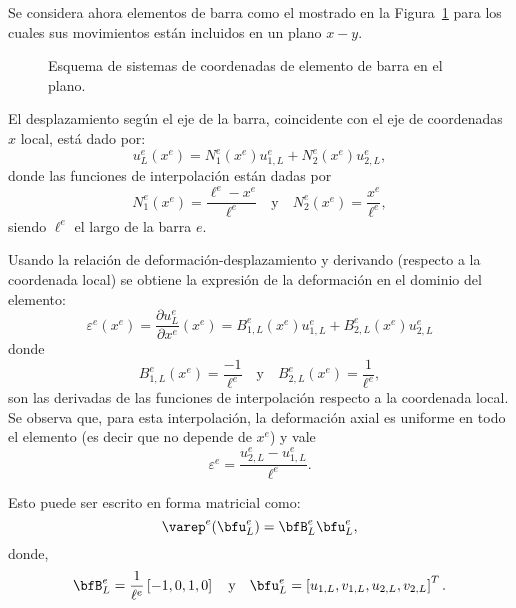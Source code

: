 Se considera ahora elementos de barra como el mostrado en la Figura~\ref{fig:eleplabar} para los cuales sus movimientos están incluidos en un plano $x-y$. %
%
\begin{figure}[htb]
	\centering
  \def\svgwidth{0.6\textwidth}
  
	\caption{Esquema de sistemas de coordenadas de elemento de barra en el plano.}
	\label{fig:eleplabar}
\end{figure}

El desplazamiento según el eje de la barra, coincidente con el eje de coordenadas $x$ local, está dado por:
%
\begin{equation}
u_L^e(x^e) = N_1^e(x^e) u_{1,L}^e  + N_2^e(x^e) u_{2,L}^e,
\end{equation}
%
donde las funciones de interpolación están dadas por
%
\begin{equation}
N_1^e(x^e) = \frac{\ell^e - x^e}{\ell^e}
\quad \text{y} \quad N_2^e(x^e) = \frac{x^e}{\ell^e},
\end{equation}
%
siendo $\ell^e$ el largo de la barra $e$.


%
Usando la relación de deformación-desplazamiento y derivando (respecto a la coordenada local) se obtiene la expresión de la deformación en el dominio del elemento:
%
\begin{equation}
\varepsilon^e(x^e) = \frac{\partial u^e_L}{\partial x^e}(x^e) =  B_{1,L}^e(x^e) u_{1,L}^e  + B_{2,L}^e(x^e) u_{2,L}^e
\end{equation}
%
donde 
\begin{equation}
B_{1,L}^e(x^e) = \frac{- 1}{\ell^e}
\quad \text{y} \quad B_{2,L}^e(x^e) = \frac{1}{\ell^e},
\end{equation}
son las derivadas de las funciones de interpolación respecto a la coordenada local. %
%
Se observa que, para esta interpolación, la deformación axial es uniforme en todo el elemento (es decir que no depende de $x^e$) y vale 
%
\begin{equation}
\varepsilon^e  =  \frac{ u_{2,L}^e - u_{1,L}^e } {\ell^e}.
\end{equation}


Esto puede ser escrito en forma matricial como:
%
\begin{equation} \label{eqn:expreps}
\varep^e (\bfu^e_L) = \bfB_L^e \bfu^e_L,
\end{equation}
%
donde,
%
\begin{equation}
\bfB_L^e = \frac{1}{\ell^e} \left[-1, 0, 1, 0\right]
\quad \text{y} \quad
\bfu_L^e = \left[u_{1,L}, v_{1,L}, u_{2,L}, v_{2,L}\right]^T.
\end{equation}

